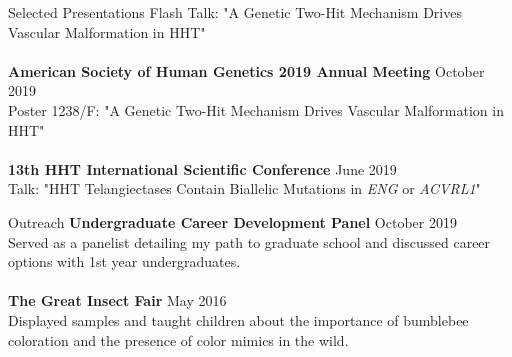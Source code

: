 \documentclass{resume} %
\begin{document}
\begin{rSection}{Selected Presentations}
Flash Talk: "A Genetic Two-Hit Mechanism Drives Vascular Malformation in HHT"\\\\
{\bf American Society of Human Genetics 2019 Annual Meeting} \hfill {October 2019}\\
Poster 1238/F: "A Genetic Two-Hit Mechanism Drives Vascular Malformation in HHT"\\\\
{\bf 13th HHT International Scientific Conference} \hfill {June 2019}\\
Talk: "HHT Telangiectases Contain Biallelic Mutations in \textit{ENG} or \textit{ACVRL1}"\\

\end{rSection}


\begin{rSection}{Outreach}
{\bf Undergraduate Career Development Panel} \hfill {October 2019}\\
Served as a panelist detailing my path to graduate school and discussed career options with 1st year undergraduates.\\\\
{\bf The Great Insect Fair} \hfill {May 2016}\\
Displayed samples and taught children about the importance of bumblebee coloration and the presence of color mimics in the wild.\\

\end{rSection}
\end{document}
